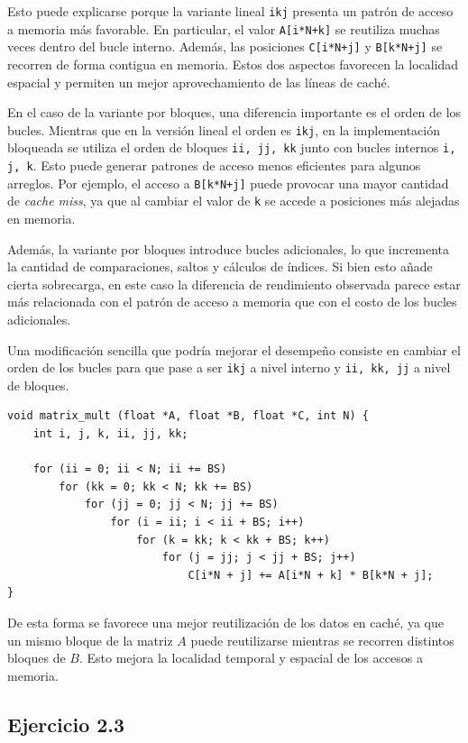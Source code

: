 \documentclass[11pt,a4paper]{article}
\begin{document}
Esto puede explicarse porque la variante lineal \texttt{ikj} presenta un patrón de acceso a memoria más favorable. En particular, el valor \texttt{A[i*N+k]} se reutiliza muchas veces dentro del bucle interno. Además, las posiciones \texttt{C[i*N+j]} y \texttt{B[k*N+j]} se recorren de forma contigua en memoria. Estos dos aspectos favorecen la localidad espacial y permiten un mejor aprovechamiento de las líneas de caché.

En el caso de la variante por bloques, una diferencia importante es el orden de los bucles. Mientras que en la versión lineal el orden es \texttt{ikj}, en la implementación bloqueada se utiliza el orden de bloques \texttt{ii, jj, kk} junto con bucles internos \texttt{i, j, k}. Esto puede generar patrones de acceso menos eficientes para algunos arreglos. Por ejemplo, el acceso a \texttt{B[k*N+j]} puede provocar una mayor cantidad de \textit{cache miss}, ya que al cambiar el valor de \texttt{k} se accede a posiciones más alejadas en memoria.

Además, la variante por bloques introduce bucles adicionales, lo que incrementa la cantidad de comparaciones, saltos y cálculos de índices. Si bien esto añade cierta sobrecarga, en este caso la diferencia de rendimiento observada parece estar más relacionada con el patrón de acceso a memoria que con el costo de los bucles adicionales.

Una modificación sencilla que podría mejorar el desempeño consiste en cambiar el orden de los bucles para que pase a ser \texttt{ikj} a nivel interno y \texttt{ii, kk, jj} a nivel de bloques.

\begin{lstlisting}[caption={Multiplicación por bloques con orden de bucles mejorado (ii, kk, jj)}]
void matrix_mult (float *A, float *B, float *C, int N) {
    int i, j, k, ii, jj, kk;

    for (ii = 0; ii < N; ii += BS)
        for (kk = 0; kk < N; kk += BS)
            for (jj = 0; jj < N; jj += BS)
                for (i = ii; i < ii + BS; i++)
                    for (k = kk; k < kk + BS; k++)
                        for (j = jj; j < jj + BS; j++)
                            C[i*N + j] += A[i*N + k] * B[k*N + j];
}
\end{lstlisting}

De esta forma se favorece una mejor reutilización de los datos en caché, ya que un mismo bloque de la matriz \(A\) puede reutilizarse mientras se recorren distintos bloques de \(B\). Esto mejora la localidad temporal y espacial de los accesos a memoria.

\subsection{Ejercicio 2.3}
\end{document}
